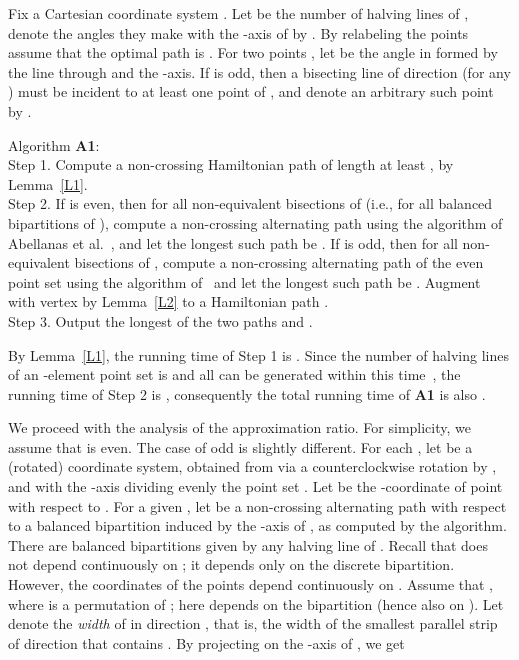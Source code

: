 \documentclass[proceedings]{stacs}
\begin{document}
Fix a Cartesian coordinate system .
Let  be the number of halving lines of , denote the angles they
make with the -axis of  by .
By relabeling the points assume that the optimal path is
.
For two points , let  be the angle in 
formed by the line through  and the -axis.
If  is odd, then a bisecting line of direction  (for any )
must be incident to at least one point of , and denote an arbitrary such
point by .

\smallskip
\noindent Algorithm {\bf A1}:\\
{\sc Step 1}. Compute a non-crossing
Hamiltonian path  of length at least , by Lemma~\ref{L1}.\\
{\sc Step 2}. If  is even, then for all non-equivalent bisections of
 (i.e., for all balanced bipartitions of ), compute a non-crossing
alternating path using the algorithm of Abellanas et al.~\cite{AGH+99}, and
let the longest such path be . If  is odd, then for all non-equivalent
bisections of , compute a non-crossing
alternating path of the even point set  using the
algorithm of~\cite{AGH+99} and let the longest such path be .
Augment  with vertex  by Lemma~\ref{L2} to a Hamiltonian path
.\\
{\sc Step 3}. Output the longest of the two paths  and .

\smallskip
By Lemma~\ref{L1}, the running time of {\sc Step 1} is
. Since the number of halving lines of an -element
point set is  and all can be generated within this time~\cite{De98},
the running time of {\sc Step 2} is , consequently
the total running time of {\bf A1} is also .


We proceed with the analysis of the approximation ratio.
For simplicity, we assume that  is even. The case of  odd is
slightly different.
For each , let 
be a (rotated) coordinate system, obtained from  via a
counterclockwise rotation by , and with the -axis dividing
evenly the point set . Let  be the -coordinate of point
 with respect to .
For a given , let  be a non-crossing alternating
path with respect to a balanced bipartition induced by the -axis of
, as computed by the algorithm.
There are  balanced bipartitions given by any halving line of
. Recall that  does not depend continuously on
; it depends only on the discrete bipartition. However, the
coordinates of the points depend continuously on .
Assume that ,
where  is a permutation of ; here  depends
on the bipartition (hence also on ).
Let  denote the {\em width} of  in direction , that is,
the width of the smallest parallel strip of direction  that contains .
By projecting on the -axis of , we get
\end{document}
